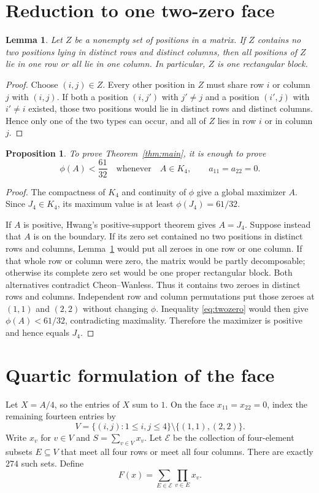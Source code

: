 \documentclass[11pt]{article}
\newtheorem{proposition}[theorem]{Proposition}
\newtheorem{lemma}[theorem]{Lemma}
\begin{document}
\section{Reduction to one two-zero face}

\begin{lemma}\label{lem:zeros}
Let $Z$ be a nonempty set of positions in a matrix. If $Z$ contains no two positions lying in distinct rows and distinct columns, then all positions of $Z$ lie in one row or all lie in one column. In particular, $Z$ is one rectangular block.
\end{lemma}

\begin{proof}
Choose $(i,j)\in Z$. Every other position in $Z$ must share row $i$ or column $j$ with $(i,j)$. If both a position $(i,j')$ with $j'\ne j$ and a position $(i',j)$ with $i'\ne i$ existed, those two positions would lie in distinct rows and distinct columns. Hence only one of the two types can occur, and all of $Z$ lies in row $i$ or in column $j$.
\end{proof}

\begin{proposition}\label{prop:reduction}
To prove Theorem~\ref{thm:main}, it is enough to prove
\[
 \phi(A)<\frac{61}{32}
 \quad\text{whenever}\quad
 A\in K_4,\qquad a_{11}=a_{22}=0.
 \tag{1}\label{eq:twozero}
\]
\end{proposition}

\begin{proof}
The compactness of $K_4$ and continuity of $\phi$ give a global maximizer $A$. Since $J_4\in K_4$, its maximum value is at least $\phi(J_4)=61/32$.

If $A$ is positive, Hwang's positive-support theorem gives $A=J_4$. Suppose instead that $A$ is on the boundary. If its zero set contained no two positions in distinct rows and columns, Lemma~\ref{lem:zeros} would put all zeroes in one row or one column. If that whole row or column were zero, the matrix would be partly decomposable; otherwise its complete zero set would be one proper rectangular block. Both alternatives contradict Cheon--Wanless. Thus it contains two zeroes in distinct rows and columns. Independent row and column permutations put those zeroes at $(1,1)$ and $(2,2)$ without changing $\phi$. Inequality \eqref{eq:twozero} would then give $\phi(A)<61/32$, contradicting maximality. Therefore the maximizer is positive and hence equals $J_4$.
\end{proof}

\section{Quartic formulation of the face}
Let $X=A/4$, so the entries of $X$ sum to $1$. On the face $x_{11}=x_{22}=0$, index the remaining fourteen entries by
\[
 V=\{(i,j):1\le i,j\le4\}\setminus\{(1,1),(2,2)\}.
\]
Write $x_v$ for $v\in V$ and $S=\sum_{v\in V}x_v$. Let $\mathcal E$ be the collection of four-element subsets $E\subseteq V$ that meet all four rows or meet all four columns. There are exactly $274$ such sets. Define
\[
 F(x)=\sum_{E\in\mathcal E}\prod_{v\in E}x_v.
 \tag{2}\label{eq:F}
\]
\end{document}
